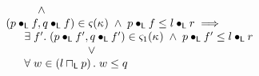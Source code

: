 \begin{definition}
\[\begin{array}{l}
\begin{array}{l}
		\hspace*{1cm} \land\\
		
		(p \composeL f, q \composeL f) \in \amod{}(\ca{})
		\;\land\; p \composeL f \leq l \composeL r \implies \\
		\hspace*{0.4cm}
		\begin{array}{l}
			\exsts{f'} (p \composeL f', q \composeL f') \in \amod{1}(\ca{}) \;\land\; p \composeL f' \leq l \composeL r \\
			\hspace*{2cm} \lor\\
			\for{w \in \left( l \meetL p \right)} w \leq q
		\end{array}

	\end{array}\\\\
	
%		
	
\end{array}
\]
%
\end{definition}
